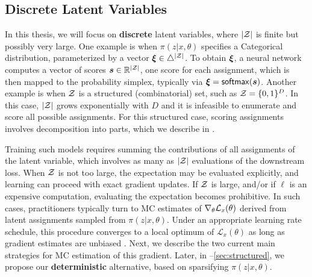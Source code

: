 \subsection{Discrete Latent Variables}\label{sec:discrete_lvm_bg}

\noindent In this thesis, we will focus on \textbf{discrete} latent variables, where
$|\mathcal{Z}|$ is finite but possibly very large. One example is when
$\pi(z|x,\theta)$ specifies a Categorical distribution, parameterized by a
vector $\bm{\xi} \in \triangle^{|\mathcal{Z}|}$. To obtain $\bm{\xi}$, a neural network
computes a vector of scores $\bm{s} \in \mathbb{R}^{|\mathcal{Z}|}$, one score
for each assignment, which is then mapped to the probability simplex,
typically via $\bm{\xi} = \operatorname*{\mathsf{softmax}}(\bm{s})$. Another example is when $\mathcal{Z}$ is
a structured (combinatorial) set, such as $\mathcal{Z} = \{0, 1\}^D$. In this
case, $|\mathcal{Z}|$ grows exponentially with $D$ and it is infeasible to
enumerate and score all possible assignments. For this structured
case, scoring assignments involves decomposition into parts, which
we describe in .

Training such models requires summing the contributions of all
assignments of the latent variable, which involves as many as $|\mathcal{Z}|$
evaluations of the downstream loss. When $\mathcal{Z}$ is not too large, the
expectation may be evaluated explicitly, and learning can proceed
with exact gradient updates. If $\mathcal{Z}$ is large, and/or if $\ell$ is
an expensive computation, evaluating the expectation becomes
prohibitive. In such cases, practitioners typically turn to MC
estimates of $\nabla_\theta \mathcal{L}_x(\theta)$ derived from latent
assignments sampled from $\pi(z|x,\theta)$. Under an appropriate
learning rate schedule, this procedure converges to a local optimum
of $\mathcal L_x(\theta)$ as long as gradient estimates are unbiased
\citep{robbins1951stochastic}. Next, we describe the two current main
strategies for MC estimation of this gradient. Later, in
--\ref{sec:structured}, we propose our
\textbf{deterministic} alternative, based on sparsifying $\pi(z| x,
    \theta)$.

